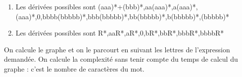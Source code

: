 \begin{enumerate}
	\item Les dérivées possibles sont (aaa)*+(bbb)*,aa(aaa)*,a(aaa)*,(aaa)*,0,bbbb(bbbbb)*,bbb(bbbbb)*,bb(bbbbb)*,b(bbbbb)*,(bbbbb)*
	\item Les dérivées possibles sont R*,aaR*,aR*,0,bR*,bbR*,bbbR*,bbbbR*
\end{enumerate}

 On calcule le graphe et on le parcourt en suivant les lettres de l'expression demandée. On calcule la complexité sans tenir compte du temps de calcul du graphe : c'est le nombre de caractères du mot.
